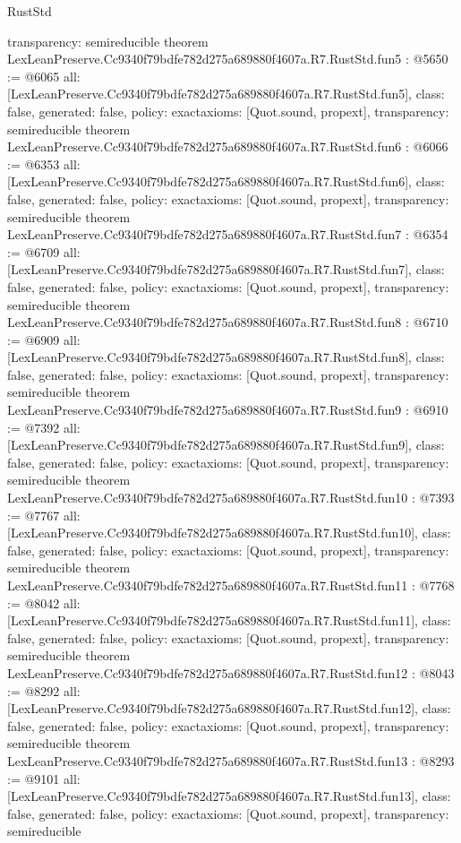 \begin{lexlean}{RustStd}
\begin{coremodule}
{  transparency: semireducible
}
theorem LexLeanPreserve.Cc9340f79bdfe782d275a689880f4607a.R7.RustStd.fun5 : @5650 := @6065 {
  all: [LexLeanPreserve.Cc9340f79bdfe782d275a689880f4607a.R7.RustStd.fun5],
  class: false,
  generated: false,
  policy: exact{axioms: [Quot.sound, propext]},
  transparency: semireducible
}
theorem LexLeanPreserve.Cc9340f79bdfe782d275a689880f4607a.R7.RustStd.fun6 : @6066 := @6353 {
  all: [LexLeanPreserve.Cc9340f79bdfe782d275a689880f4607a.R7.RustStd.fun6],
  class: false,
  generated: false,
  policy: exact{axioms: [Quot.sound, propext]},
  transparency: semireducible
}
theorem LexLeanPreserve.Cc9340f79bdfe782d275a689880f4607a.R7.RustStd.fun7 : @6354 := @6709 {
  all: [LexLeanPreserve.Cc9340f79bdfe782d275a689880f4607a.R7.RustStd.fun7],
  class: false,
  generated: false,
  policy: exact{axioms: [Quot.sound, propext]},
  transparency: semireducible
}
theorem LexLeanPreserve.Cc9340f79bdfe782d275a689880f4607a.R7.RustStd.fun8 : @6710 := @6909 {
  all: [LexLeanPreserve.Cc9340f79bdfe782d275a689880f4607a.R7.RustStd.fun8],
  class: false,
  generated: false,
  policy: exact{axioms: [Quot.sound, propext]},
  transparency: semireducible
}
theorem LexLeanPreserve.Cc9340f79bdfe782d275a689880f4607a.R7.RustStd.fun9 : @6910 := @7392 {
  all: [LexLeanPreserve.Cc9340f79bdfe782d275a689880f4607a.R7.RustStd.fun9],
  class: false,
  generated: false,
  policy: exact{axioms: [Quot.sound, propext]},
  transparency: semireducible
}
theorem LexLeanPreserve.Cc9340f79bdfe782d275a689880f4607a.R7.RustStd.fun10 : @7393 := @7767 {
  all: [LexLeanPreserve.Cc9340f79bdfe782d275a689880f4607a.R7.RustStd.fun10],
  class: false,
  generated: false,
  policy: exact{axioms: [Quot.sound, propext]},
  transparency: semireducible
}
theorem LexLeanPreserve.Cc9340f79bdfe782d275a689880f4607a.R7.RustStd.fun11 : @7768 := @8042 {
  all: [LexLeanPreserve.Cc9340f79bdfe782d275a689880f4607a.R7.RustStd.fun11],
  class: false,
  generated: false,
  policy: exact{axioms: [Quot.sound, propext]},
  transparency: semireducible
}
theorem LexLeanPreserve.Cc9340f79bdfe782d275a689880f4607a.R7.RustStd.fun12 : @8043 := @8292 {
  all: [LexLeanPreserve.Cc9340f79bdfe782d275a689880f4607a.R7.RustStd.fun12],
  class: false,
  generated: false,
  policy: exact{axioms: [Quot.sound, propext]},
  transparency: semireducible
}
theorem LexLeanPreserve.Cc9340f79bdfe782d275a689880f4607a.R7.RustStd.fun13 : @8293 := @9101 {
  all: [LexLeanPreserve.Cc9340f79bdfe782d275a689880f4607a.R7.RustStd.fun13],
  class: false,
  generated: false,
  policy: exact{axioms: [Quot.sound, propext]},
  transparency: semireducible
}
\end{coremodule}
\end{lexlean}
